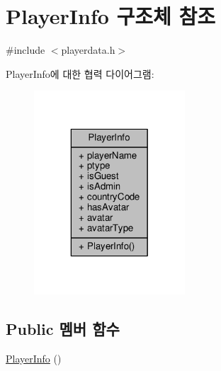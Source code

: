\hypertarget{struct_player_info}{\section{Player\-Info 구조체 참조}
\label{struct_player_info}
}


{\ttfamily \#include $<$playerdata.\-h$>$}



Player\-Info에 대한 협력 다이어그램\-:\nopagebreak
\begin{figure}[H]
\begin{center}
\leavevmode
\includegraphics[width=160pt]{struct_player_info__coll__graph}
\end{center}
\end{figure}
\subsection*{Public 멤버 함수}
\begin{DoxyCompactItemize}
\item 
\hyperlink{struct_player_info_a05e9b9529ed8e4638b2bd2fb76b3abeb}{Player\-Info} ()
\end{DoxyCompactItemize}
